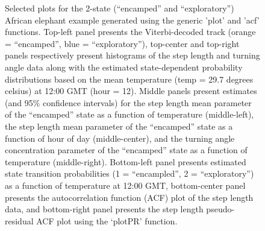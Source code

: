 \documentclass[12pt]{article}\usepackage[]{graphicx}\usepackage[]{color}
\begin{document}
\begin{figure}[htbp]
  \caption{Selected plots for the 2-state (``encamped'' and ``exploratory'') African elephant example generated using the generic 'plot' and 'acf' functions. Top-left panel presents the Viterbi-decoded track (orange = ``encamped'', blue = ``exploratory''), top-center and top-right panels respectively present histograms of the step length and turning angle data along with the estimated state-dependent probability distributions based on the mean temperature (temp = 29.7 degrees celsius) at 12:00 GMT (hour = 12).  Middle panels present estimates (and 95\% confidence intervals) for the step length mean parameter of the ``encamped'' state as a function of temperature (middle-left), the step length mean parameter of the ``encamped'' state as a function of hour of day (middle-center), and the turning angle concentration parameter of the ``encamped'' state as a function of temperature (middle-right).  Bottom-left panel presents estimated state transition probabilities (1 = ``encampled'', 2 = ``exploratory'') as a function of temperature at 12:00 GMT, bottom-center panel presents the autocorrelation function (ACF) plot of the step length data, and bottom-right panel presents the step length pseudo-residual ACF plot using the `plotPR' function.}
  \label{fig:elephantResults}
\end{figure}
\end{document}
